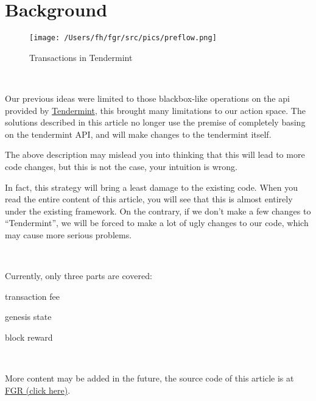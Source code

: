 \section{Background}

\begin{figure}[htbp]
    \centering
    \texttt{[image: /Users/fh/fgr/src/pics/preflow.png]}
    \caption{Transactions in Tendermint}
\end{figure}

~\par

Our previous ideas were limited to those blackbox-like operations on the api provided by
\href{https://github.com/tendermint/tendermint}{Tendermint}, this brought many limitations to our action space.
The solutions described in this article no longer use the premise of completely basing on the tendermint API,
and will make changes to the tendermint itself.

The above description may mislead you into thinking that this will lead to more code changes,
but this is not the case, your intuition is wrong.

In fact, this strategy will bring a least damage to the existing code.
When you read the entire content of this article, you will see that
this is almost entirely under the existing framework.
On the contrary, if we don’t make a few changes to ``Tendermint'',
we will be forced to make a lot of ugly changes to our code, which may cause more serious problems.

~\par

Currently, only three parts are covered:

\begin{ITEMIZE}
    \item  transaction fee
    \item  genesis state
    \item  block reward
\end{ITEMIZE}

~\par

More content may be added in the future, the source code of this article is at \href{https://github.com/FindoraNetwork/fgr}{FGR (click here)}.
